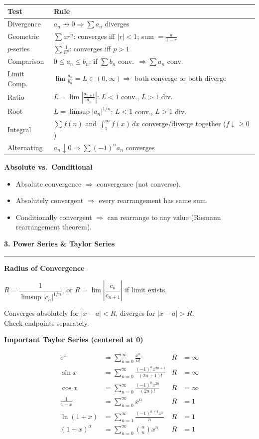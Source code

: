 \documentclass[10pt,twocolumn]{article}
\newcommand{\sect}[1]{\medskip\noindent\textbf{\large #1}\medskip\hrule\smallskip}
\newcommand{\subsect}[1]{\smallskip\noindent\textbf{#1}\par}
\begin{document}
\begin{tabular}{@{}lp{4.8cm}@{}}
\toprule
\textbf{Test} & \textbf{Rule} \\
\midrule
Divergence & $a_n\not\to 0 \Rightarrow \sum a_n$ diverges \\[3pt]
Geometric & $\sum ar^n$: converges iff $|r|<1$; sum $=\frac{a}{1-r}$ \\[3pt]
$p$-series & $\sum\frac{1}{n^p}$: converges iff $p>1$ \\[3pt]
Comparison & $0\le a_n\le b_n$: if $\sum b_n$ conv.\ $\Rightarrow\sum a_n$ conv. \\[3pt]
Limit Comp. & $\lim\frac{a_n}{b_n}=L\in(0,\infty)\Rightarrow$ both converge or both diverge \\[3pt]
Ratio & $L=\lim\left|\frac{a_{n+1}}{a_n}\right|$: $L<1$ conv., $L>1$ div. \\[3pt]
Root & $L=\limsup|a_n|^{1/n}$: $L<1$ conv., $L>1$ div. \\[3pt]
Integral & $\sum f(n)$ and $\int_1^\infty f(x)\,dx$ converge/diverge together ($f\downarrow\ge 0$) \\[3pt]
Alternating & $a_n\downarrow 0 \Rightarrow \sum(-1)^n a_n$ converges \\
\bottomrule
\end{tabular}

\subsect{Absolute vs.\ Conditional}
\begin{itemize}[nosep,leftmargin=*]
\item Absolute convergence $\Rightarrow$ convergence (not converse).
\item Absolutely convergent $\Rightarrow$ every rearrangement has same sum.
\item Conditionally convergent $\Rightarrow$ can rearrange to any value (Riemann rearrangement theorem).
\end{itemize}

\sect{3. Power Series \& Taylor Series}

\subsect{Radius of Convergence}
$R = \dfrac{1}{\limsup|c_n|^{1/n}}$, \quad or \quad $R = \lim\left|\dfrac{c_n}{c_{n+1}}\right|$ if limit exists.

Converges absolutely for $|x-a|<R$, diverges for $|x-a|>R$.\\
Check endpoints separately.

\subsect{Important Taylor Series (centered at 0)}
\begin{align*}
e^x &= \textstyle\sum_{n=0}^{\infty}\frac{x^n}{n!} & R&=\infty \\[2pt]
\sin x &= \textstyle\sum_{n=0}^{\infty}\frac{(-1)^n x^{2n+1}}{(2n+1)!} & R&=\infty \\[2pt]
\cos x &= \textstyle\sum_{n=0}^{\infty}\frac{(-1)^n x^{2n}}{(2n)!} & R&=\infty \\[2pt]
\frac{1}{1-x} &= \textstyle\sum_{n=0}^{\infty} x^n & R&=1 \\[2pt]
\ln(1+x) &= \textstyle\sum_{n=1}^{\infty}\frac{(-1)^{n+1}x^n}{n} & R&=1 \\[2pt]
(1+x)^\alpha &= \textstyle\sum_{n=0}^{\infty}\binom{\alpha}{n}x^n & R&=1
\end{align*}
\end{document}
